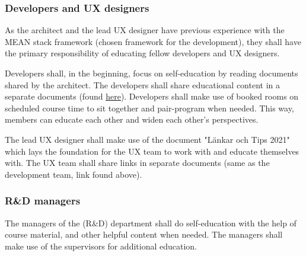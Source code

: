 \subsubsection{Developers and UX designers}
As the architect and the lead UX designer have previous experience with the MEAN stack framework (chosen framework for the development), they shall have the primary responsibility of educating fellow developers and UX designers. 

Developers shall, in the beginning, focus on self-education by reading documents shared by the architect. The developers shall share educational content in a separate documents (found \href{https://liuonline.sharepoint.com/sites/TDDC88_2021_C1/Delade\%20dokument/Forms/AllItems.aspx?RootFolder=\%2Fsites\%2FTDDC88\%5F2021\%5FC1\%2FDelade\%20dokument\%2FGeneral\%2FR\%26D&FolderCTID=0x012000EFD53ADC1DFA3C4F9DA49133CF99E2A6}{here}). Developers shall make use of booked rooms on scheduled course time to sit together and pair-program when needed. This way, members can educate each other and widen each other's perspectives. 

The lead UX designer shall make use of the document "Länkar och Tips 2021" which lays the foundation for the UX team to work with and educate themselves with. The UX team shall share links in separate documents (same as the development team, link found above). 

\subsubsection{R\&D managers}
The managers of the (R\&D) department shall do self-education with the help of course material, and other helpful content when needed. The managers shall make use of the supervisors for additional education. 
